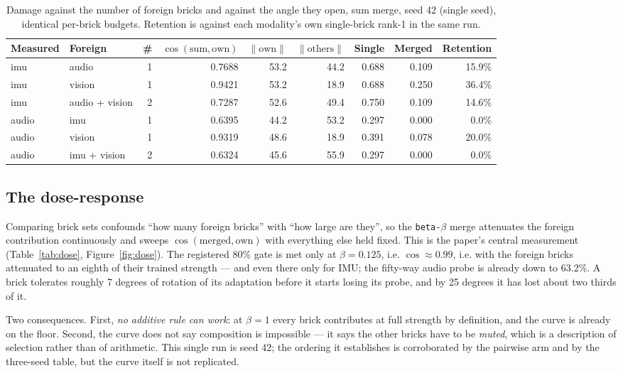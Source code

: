 \documentclass[11pt]{article}
\begin{document}
\begin{table}[t]
\centering
\caption{Damage against the number of foreign bricks and against the angle they open, sum merge, seed 42 (single seed), identical per-brick budgets. Retention is against each modality's own single-brick rank-1 in the same run.}
\label{tab:pairwise}
\small
\begin{tabular}{llrrrrrrr}
\toprule
Measured & Foreign & \# & $\cos(\mathrm{sum}, \mathrm{own})$ & $\|\mathrm{own}\|$ & $\|\mathrm{others}\|$ & Single & Merged & Retention \\
\midrule
imu & audio & 1 & 0.7688 & 53.2 & 44.2 & 0.688 & 0.109 & 15.9\% \\
imu & vision & 1 & 0.9421 & 53.2 & 18.9 & 0.688 & 0.250 & 36.4\% \\
imu & audio + vision & 2 & 0.7287 & 52.6 & 49.4 & 0.750 & 0.109 & 14.6\% \\
audio & imu & 1 & 0.6395 & 44.2 & 53.2 & 0.297 & 0.000 & 0.0\% \\
audio & vision & 1 & 0.9319 & 48.6 & 18.9 & 0.391 & 0.078 & 20.0\% \\
audio & imu + vision & 2 & 0.6324 & 45.6 & 55.9 & 0.297 & 0.000 & 0.0\% \\
\bottomrule
\end{tabular}
\end{table}

\subsection{The dose-response}
Comparing brick sets confounds ``how many foreign bricks'' with ``how large are they'', so the \texttt{beta-}$\beta$ merge attenuates the foreign contribution continuously and sweeps $\cos(\mathrm{merged}, \mathrm{own})$ with everything else held fixed. This is the paper's central measurement (Table~\ref{tab:dose}, Figure~\ref{fig:dose}). The registered 80\% gate is met only at $\beta = 0.125$, i.e. $\cos \approx 0.99$, i.e. with the foreign bricks attenuated to an eighth of their trained strength --- and even there only for IMU; the fifty-way audio probe is already down to 63.2\%. A brick tolerates roughly 7 degrees of rotation of its adaptation before it starts losing its probe, and by 25 degrees it has lost about two thirds of it.

Two consequences. First, \emph{no additive rule can work}: at $\beta = 1$ every brick contributes at full strength by definition, and the curve is already on the floor. Second, the curve does not say composition is impossible --- it says the other bricks have to be \emph{muted}, which is a description of selection rather than of arithmetic. This single run is seed 42; the ordering it establishes is corroborated by the pairwise arm and by the three-seed table, but the curve itself is not replicated.
\end{document}
